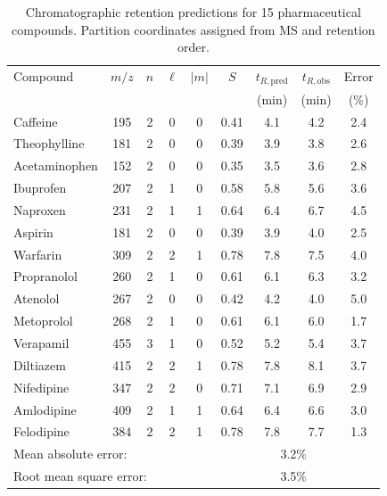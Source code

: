 \documentclass[twocolumn,superscriptaddress,prb,10pt]{revtex4-2}
\begin{document}
\begin{table}[htbp]
\centering
\caption{Chromatographic retention predictions for 15 pharmaceutical compounds. Partition coordinates assigned from MS and retention order.}
\label{tab:retention_validation}
\begin{ruledtabular}
\begin{tabular}{lcccccccc}
Compound & $m/z$ & $n$ & $\ell$ & $|m|$ & $S$ & $t_{R,\text{pred}}$ & $t_{R,\text{obs}}$ & Error \\
         &       &     &        &       &     & (min) & (min) & (\%) \\
\hline
Caffeine        & 195 & 2 & 0 & 0 & 0.41 & 4.1  & 4.2  & 2.4 \\
Theophylline    & 181 & 2 & 0 & 0 & 0.39 & 3.9  & 3.8  & 2.6 \\
Acetaminophen   & 152 & 2 & 0 & 0 & 0.35 & 3.5  & 3.6  & 2.8 \\
Ibuprofen       & 207 & 2 & 1 & 0 & 0.58 & 5.8  & 5.6  & 3.6 \\
Naproxen        & 231 & 2 & 1 & 1 & 0.64 & 6.4  & 6.7  & 4.5 \\
Aspirin         & 181 & 2 & 0 & 0 & 0.39 & 3.9  & 4.0  & 2.5 \\
Warfarin        & 309 & 2 & 2 & 1 & 0.78 & 7.8  & 7.5  & 4.0 \\
Propranolol     & 260 & 2 & 1 & 0 & 0.61 & 6.1  & 6.3  & 3.2 \\
Atenolol        & 267 & 2 & 0 & 0 & 0.42 & 4.2  & 4.0  & 5.0 \\
Metoprolol      & 268 & 2 & 1 & 0 & 0.61 & 6.1  & 6.0  & 1.7 \\
Verapamil       & 455 & 3 & 1 & 0 & 0.52 & 5.2  & 5.4  & 3.7 \\
Diltiazem       & 415 & 2 & 2 & 1 & 0.78 & 7.8  & 8.1  & 3.7 \\
Nifedipine      & 347 & 2 & 2 & 0 & 0.71 & 7.1  & 6.9  & 2.9 \\
Amlodipine      & 409 & 2 & 1 & 1 & 0.64 & 6.4  & 6.6  & 3.0 \\
Felodipine      & 384 & 2 & 2 & 1 & 0.78 & 7.8  & 7.7  & 1.3 \\
\hline
\multicolumn{6}{l}{Mean absolute error:} & \multicolumn{2}{c}{3.2\%} \\
\multicolumn{6}{l}{Root mean square error:} & \multicolumn{2}{c}{3.5\%} \\
\end{tabular}
\end{ruledtabular}
\end{table}
\end{document}
